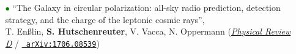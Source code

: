 \begin{itemize}
\vspace{6pt}

\item[\textcolor{Green}{$\bullet$}]{``The Galaxy in circular polarization: all-sky radio prediction, detection strategy, and the charge of the leptonic cosmic rays'', \\ T. En{\ss}lin,  \textbf{S. Hutschenreuter}, V. Vacca, N. Oppermann   (\href{https://journals.aps.org/prd/abstract/10.1103/PhysRevD.96.043021}{\color{blue}\textit{Physical Review D}} / \href{https://arxiv.org/abs/1706.08539}{\texttt{{\color{blue} arXiv:1706.08539}}})}
\end{itemize}
